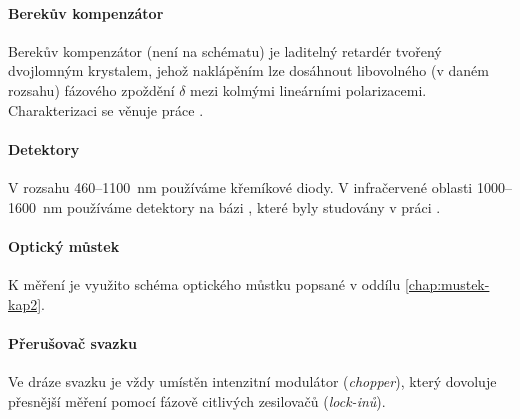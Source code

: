 \paragraph{Berekův kompenzátor}
Berekův kompenzátor (není na schématu) je laditelný retardér tvořený dvojlomným krystalem, jehož naklápěním lze dosáhnout libovolného (v daném rozsahu) fázového zpoždění $\delta$ mezi kolmými lineárními polarizacemi.
Charakterizaci se věnuje práce \cite{schusserSkryteKouzloPolarizace2014}.

\paragraph{Detektory}
V rozsahu \num{460}--\SI{1100}{\nano\meter} používáme křemíkové diody.
V infračervené oblasti \num{1000}--\SI{1600}{\nano\meter} používáme detektory na bázi , které byly studovány v práci \cite{hovorakovaCharakterizaceInfracervenehoDetektoru}.

\paragraph{Optický můstek}
K měření je využito schéma optického můstku popsané v oddílu \ref{chap:mustek-kap2}.

\paragraph{Přerušovač svazku}
Ve dráze svazku je vždy umístěn intenzitní modulátor (\emph{chopper}), který dovoluje přesnější měření pomocí fázově citlivých zesilovačů (\emph{lock-inů}).
